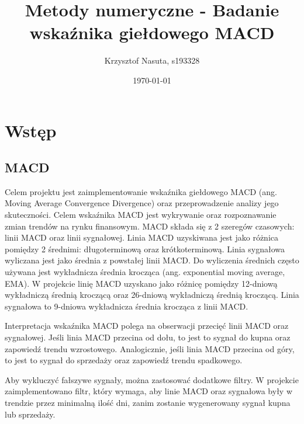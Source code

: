 \documentclass[12pt, a4paper]{article}
\title{Metody numeryczne - Badanie wskaźnika giełdowego MACD}
\author{Krzysztof Nasuta, s193328}
\date{\today}
\begin{document}
\maketitle

\section{Wstęp}

\subsection{MACD}
Celem projektu jest zaimplementowanie wskaźnika giełdowego MACD (ang. Moving Average Convergence Divergence)
oraz przeprowadzenie analizy jego skuteczności. Celem wskaźnika MACD jest wykrywanie oraz rozpoznawanie
zmian trendów na rynku finansowym. MACD składa się z 2 szeregów czasowych: linii MACD oraz linii sygnałowej.
Linia MACD uzyskiwana jest jako różnica pomiędzy 2 średnimi: długoterminową oraz krótkoterminową.
Linia sygnałowa wyliczana jest jako średnia z powstałej linii MACD. Do wyliczenia średnich często
używana jest wykładnicza średnia krocząca (ang. exponential moving average, EMA). W projekcie linię MACD uzyskano jako różnicę
pomiędzy 12-dniową wykładniczą średnią kroczącą oraz 26-dniową wykładniczą średnią kroczącą. Linia sygnałowa to
9-dniowa wykładnicza średnia krocząca z linii MACD.

Interpretacja wskaźnika MACD polega na obserwacji przecięć linii MACD oraz sygnałowej. Jeśli linia MACD przecina od dołu,
to jest to sygnał do kupna oraz zapowiedź trendu wzrostowego. Analogicznie, jeśli linia MACD przecina od góry, to jest to sygnał
do sprzedaży oraz zapowiedź trendu spadkowego.

Aby wykluczyć fałszywe sygnały, można zastosować dodatkowe filtry. W projekcie zaimplementowano filtr, który wymaga, aby linie MACD oraz sygnałowa
były w trendzie przez minimalną ilość dni, zanim zostanie wygenerowany sygnał kupna lub sprzedaży.
\end{document}

